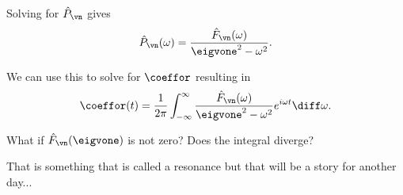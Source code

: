 \begin{frame}
	Solving for $ \hat{P}_{\vn} $ gives
	\[ \hat{P}_{\vn} (\omega) = \frac{\hat{F}_{\vn} (\omega)}{\eigvone^2 - \omega^2}. \]
	
	\pause
	We can use this to solve for $ \coeffor $ resulting in
	\[ \coeffor (t) = \frac{1}{2\pi} \int_{-\infty}^{\infty} \frac{\hat{F}_{\vn}(\omega)}{\eigvone^2 - \omega^2} e^{i \omega t}  
	\diff \omega.
	\]
	
	\pause
	What if $ \hat{F}_{\vn} (\eigvone) $ is not zero? Does the integral diverge? 
	
	\pause
	That is something that is called a \alert{resonance} but that will be a story for another day...
\end{frame}


